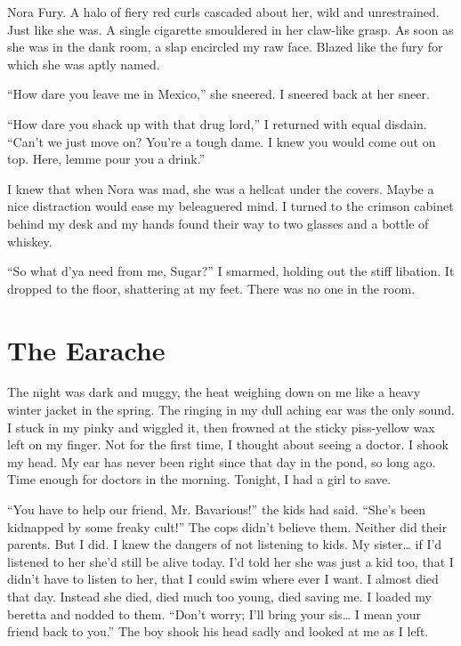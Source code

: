 Nora Fury. A halo of fiery red curls cascaded about her, wild and
unrestrained. Just like she was. A single cigarette smouldered in
her claw-like grasp. As soon as she was in the dank room, a slap
encircled my raw face. Blazed like the fury for which she was aptly
named.

``How dare you leave me in Mexico,'' she sneered. I sneered back at
her sneer.

``How dare you shack up with that drug lord,'' I returned with equal
disdain. ``Can't we just move on? You're a tough dame. I knew you
would come out on top. Here, lemme pour you a drink.''

I knew that when Nora was mad, she was a hellcat under the covers.
Maybe a nice distraction would ease my beleaguered mind. I turned
to the crimson cabinet behind my desk and my hands found their way
to two glasses and a bottle of whiskey.

``So what d'ya need from me, Sugar?'' I smarmed, holding out the
stiff libation. It dropped to the floor, shattering at my feet.
There was no one in the room.
 



\chapter{The Earache}



The night was dark and muggy, the heat weighing down on me like a
heavy winter jacket in the spring. The ringing in my dull aching
ear was the only sound. I stuck in my pinky and wiggled it, then
frowned at the sticky piss-yellow wax left on my finger. Not for
the first time, I thought about seeing a doctor. I shook my head.
My ear has never been right since that day in the pond, so long
ago. Time enough for doctors in the morning. Tonight, I had a girl
to save.



``You have to help our friend, Mr. Bavarious!'' the kids
had said. ``She's been kidnapped by some freaky
cult!'' The cops didn't believe them. Neither did their
parents. But I did. I knew the dangers of not listening to kids. My
sister{\ldots} if I'd listened to her she'd still be
alive today. I'd told her she was just a kid too, that I
didn't have to listen to her, that I could swim where ever I
want. I almost died that day. Instead she died, died much too
young, died saving me. I loaded my beretta and nodded to them.
``Don't worry; I'll bring your sis{\ldots} I mean
your friend back to you.'' The boy shook his head sadly and
looked at me as I left.




